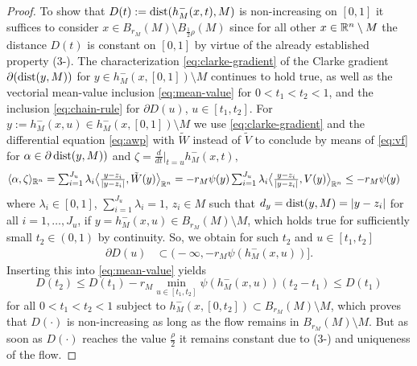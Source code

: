 \begin{proof}
To show that $D(t):=\operatorname{dist}(h_M^-(x,t),M)$ is non-increasing on $[0,1]$ it suffices
to consider $x\in B_{r_M}(M)\setminus B_{\frac12{\rho}}(M)$ since for all other
$x\in\mathbb{R}^n\setminus M$ the distance $D(t)$ is constant on $[0,1]$ by virtue
of the already established property (3-). The characterization 
\eqref{eq:clarke-gradient}
of the Clarke gradient 
$\partial (\operatorname{dist}(y,M))$ for $y\in h_M^-(x,[0,1])\setminus M$
continues to hold true, as well as the vectorial mean-value inclusion 
\eqref{eq:mean-value} for $0<t_1<t_2<1$, and the inclusion \eqref{eq:chain-rule}
for $\partial D(u)$, $u\in [t_1,t_2]$. For $y:=h_M^-(x,u)\in h_M^-(x,[0,1])\setminus
M$ we use \eqref{eq:clarke-gradient} and the differential equation
\eqref{eq:awp} with $\tilde{W}$ instead of $\tilde{V}$ to conclude by means of
\eqref{eq:vf} for
$\alpha\in\partial\operatorname{dist}(y,M))$ and $\zeta=\frac{d}{dt}|_{t=u}h_M^-(x,t),$
\begin{align*}
\langle\alpha,\zeta\rangle_{\mathbb{R}^n}&
\textstyle
=\sum_{i=1}^{J_u}\lambda_i\big\langle
\frac{y-z_i}{|y-z_i|},\tilde{W}(y)\big\rangle_{\mathbb{R}^n}
 = -r_M\psi(y)\sum_{i=1}^{J_u}\lambda_i\big\langle
\frac{y-z_i}{|y-z_i|},V(y)\big\rangle_{\mathbb{R}^n}\le -r_M\psi(y)
\end{align*}
where $\lambda_i\in [0,1]$, $\sum_{i=1}^{J_u}
\lambda_i=1$, $z_i\in M$ such that $d_y=\operatorname{dist}(y,M)=|y-z_i|$
for all $i=1,\ldots,J_u$,
if $y=h_M^-(x,u)\in B_{r_M}(M)\setminus M$, which holds true for sufficiently
small $t_2\in (0,1)$ by continuity. So, we obtain for such $t_2$ and $u\in [t_1,t_2]$
\begin{align*}
\partial D(u)
& \subset \big(-\infty,-r_M\psi(h_M^-(x,u))\big].
\end{align*}
Inserting  this into \eqref{eq:mean-value} yields
\begin{equation}\label{eq:Dmonotone}
D(t_2)\le D(t_1)-r_M\min_{u\in [t_1,t_2]}\psi(h_M^-(x,u))(t_2-t_1)\le D(t_1)
\end{equation}
for all $0<t_1<t_2<1$ 
subject to $h_M^-(x,[0,t_2])\subset B_{r_M}(M)\setminus M$,
which proves that $D(\cdot)$ is non-increasing as long as the flow remains
in $B_{r_M}(M)\setminus M$. But as soon as 
$D(\cdot)$ reaches the value $\frac{\rho}2$
it
remains constant due to (3-) and uniqueness of the flow.


\end{proof}
